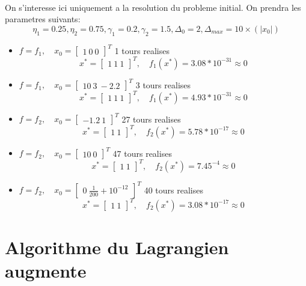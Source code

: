 \documentclass[12pt]{article}
\begin{document}
\paragraph{}
On s'interesse ici uniquement a la resolution du probleme initial. On prendra les parametres suivants:
	\[\eta_1 = 0.25, \eta_2 = 0.75, \gamma_1 = 0.2, \gamma_2 = 1.5, \Delta_0 = 2, \Delta_{max} = 10\times(|x_0|)\]
\begin{itemize}
	\item $f=f_1, \quad x_0 = \left[\begin{array}{c}1\ 0\ 0\end{array}\right]^T$ 1 tours realises
			\[x^* = \left[\begin{array}{c}1\ 1\ 1\end{array}\right]^T,\quad f_1(x^*) = 3.08*10^{-31} \approx 0\]
	\item $f=f_1, \quad x_0 = \left[\begin{array}{c}10\ 3\ -2.2\end{array}\right]^T$ 3 tours realises
			\[x^* = \left[\begin{array}{c}1\ 1\ 1\end{array}\right]^T,\quad f_1(x^*) = 4.93*10^{-31} \approx 0\]
	\item $f=f_2, \quad x_0 = \left[\begin{array}{c}-1.2\ 1\end{array}\right]^T$ 27 tours realises
			\[x^* = \left[\begin{array}{c}1\ 1\end{array}\right]^T,\quad f_2(x^*) = 5.78*10^{-17} \approx 0\]
	\item $f=f_2, \quad x_0 = \left[\begin{array}{c}10\ 0\end{array}\right]^T$ 47 tours realises
			\[x^* = \left[\begin{array}{c}1\ 1\end{array}\right]^T ,\quad f_2(x^*) = 7.45^{-4} \approx 0\]
	\item $f=f_2, \quad x_0 = \left[\begin{array}{c}0\ \frac{1}{200} + 10^{-12}\end{array}\right]^T$ 40 tours realises
			\[x^* = \left[\begin{array}{c}1\ 1\end{array}\right]^T,\quad f_2(x^*) = 3.08*10^{-17} \approx 0\]
\end{itemize}

\section{Algorithme du Lagrangien augmente}
\end{document}
